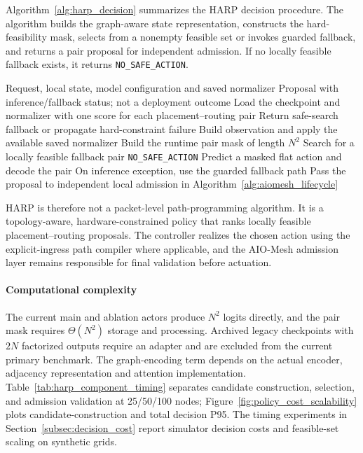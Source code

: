 \documentclass[final,5p]{elsarticle}
\newcommand{\rev}[1]{\textcolor{revisiongreen}{#1}}
\let\newrev\rev
\begin{document}
Algorithm~\ref{alg:harp_decision} summarizes the HARP decision procedure. The algorithm builds the graph-aware state representation, constructs the hard-feasibility mask, \newrev{selects from a nonempty feasible set or invokes guarded fallback, and returns a pair proposal for independent admission.} If \newrev{no locally feasible fallback exists}, it returns \texttt{NO\_SAFE\_ACTION}.

\begin{algorithm}[t]
\caption{Runtime inference path for a flat N²-action policy checkpoint}
\label{alg:harp_decision}
\small
\begin{algorithmic}[1]
\Require Request, local state, model configuration and saved normalizer
\Ensure Proposal with inference/fallback status; not a deployment outcome
\State \newrev{Load the checkpoint and normalizer with one score for each placement--routing pair}
    \State Return safe-search fallback or propagate hard-constraint failure
\EndIf
\State Build observation and apply the available saved normalizer
\State Build the runtime pair mask of length \(N^2\)
\If{\newrev{mask has wrong length or no allowed action}}
    \State \newrev{Search for a locally feasible fallback pair}
    \If{\newrev{no fallback exists}}
        \State \Return \texttt{NO\_SAFE\_ACTION}
    \EndIf
\Else
    \State Predict a masked flat action and decode the pair
\EndIf
\State On inference exception, use the guarded fallback path
\State Pass the proposal to independent local admission in Algorithm~\ref{alg:aiomesh_lifecycle}
\end{algorithmic}
\end{algorithm}

HARP is therefore not a packet-level path-programming algorithm. It is a topology-aware, hardware-constrained policy that ranks \newrev{locally feasible placement--routing proposals}. The controller realizes the chosen action \newrev{using the explicit-ingress path compiler where applicable}, and the AIO-Mesh admission layer remains responsible for final validation before actuation.

\paragraph{Computational complexity}\label{subsec:harp_complexity}
\newrev{The current main and ablation actors produce \(N^2\) logits directly, and the pair mask requires \(\Theta(N^2)\) storage and processing. Archived legacy checkpoints with \(2N\) factorized outputs require an adapter and are excluded from the current primary benchmark. The graph-encoding term depends on the actual encoder, adjacency representation and attention implementation. Table~\ref{tab:harp_component_timing} separates candidate construction, selection, and admission validation at 25/50/100 nodes; Figure~\ref{fig:policy_cost_scalability} plots candidate-construction and total decision P95. The timing experiments in Section~\ref{subsec:decision_cost} report simulator decision costs and feasible-set scaling on synthetic grids.}
\end{document}
